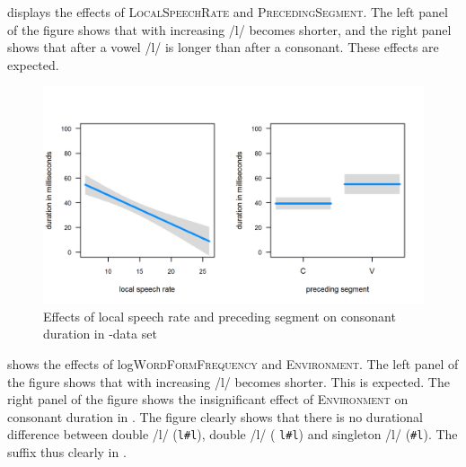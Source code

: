  displays the effects of \textsc{LocalSpeechRate} and \textsc{PrecedingSegment}. The left panel of the figure shows that with increasing  /l/ becomes shorter, and the right panel shows that after a vowel /l/ is longer than after a consonant. These effects are expected.





\begin{figure}
	
		
	\includegraphics[scale=.8] {images/Corpus/lyModelcov.png}
	\caption{Effects of local speech rate and preceding segment on consonant duration in -data set}
	\label{fig:corpus covariates ly}
\end{figure}





 shows the effects of log\textsc{WordFormFrequency} and \textsc{Environment}.
The left panel of the figure shows that with increasing  /l/ becomes shorter. This is expected.
The right panel of the figure shows the insignificant effect of \textsc{Environment} on consonant duration in . The figure clearly shows that there is no durational difference between double /l/ (\texttt{l\#l}),  double /l/ ( \texttt{l\#l}) and singleton /l/ (\texttt{\#l}). The suffix  thus clearly  in . 


